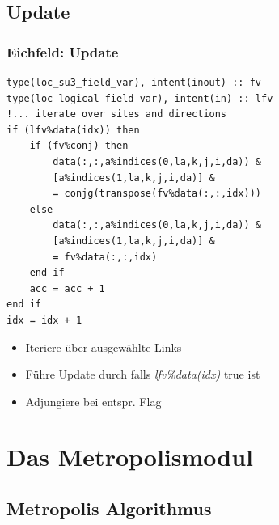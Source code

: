 \documentclass[10pt]{beamer}
\begin{document}
\subsection*{Update}

\begin{frame}[fragile]
    \frametitle{Eichfeld: Update}
    \begin{minipage}{0.58\linewidth}
    \begin{lstlisting}
type(loc_su3_field_var), intent(inout) :: fv
type(loc_logical_field_var), intent(in) :: lfv
!... iterate over sites and directions
if (lfv%data(idx)) then
    if (fv%conj) then
        data(:,:,a%indices(0,la,k,j,i,da)) &
        [a%indices(1,la,k,j,i,da)] &
        = conjg(transpose(fv%data(:,:,idx)))
    else
        data(:,:,a%indices(0,la,k,j,i,da)) &
        [a%indices(1,la,k,j,i,da)] &
        = fv%data(:,:,idx)
    end if
    acc = acc + 1
end if
idx = idx + 1
	\end{lstlisting}
	\end{minipage}
    \hfill
    \begin{minipage}{0.38\linewidth}
        \begin{itemize}
        	\item Iteriere über ausgewählte Links
        	\item Führe Update durch falls \emph{lfv\%data(idx)} true ist
        	\item Adjungiere bei entspr. Flag
        \end{itemize}
    \end{minipage}
\end{frame}

\section{Das Metropolismodul}


\subsection*{Metropolis Algorithmus}
\end{document}
